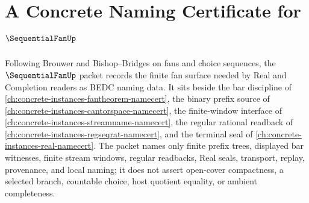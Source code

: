 \chapter{A Concrete Naming Certificate for $\SequentialFanUp$}
\label{ch:concrete-instances-sequential-fan-namecert}

Following Brouwer and Bishop--Bridges on fans and choice sequences, the $\SequentialFanUp$ packet records the finite fan surface needed by Real and Completion readers as BEDC naming data. It sits beside the bar discipline of \autoref{ch:concrete-instances-fantheorem-namecert}, the binary prefix source of \autoref{ch:concrete-instances-cantorspace-namecert}, the finite-window interface of \autoref{ch:concrete-instances-streamname-namecert}, the regular rational readback of \autoref{ch:concrete-instances-regseqrat-namecert}, and the terminal seal of \autoref{ch:concrete-instances-real-namecert}. The packet names only finite prefix trees, displayed bar witnesses, finite stream windows, regular readbacks, Real seals, transport, replay, provenance, and local naming; it does not assert open-cover compactness, a selected branch, countable choice, host quotient equality, or ambient completeness.


